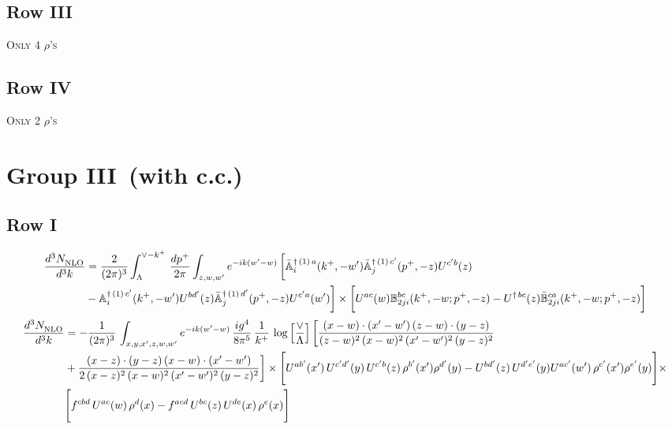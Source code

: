 \documentclass[9pt]{article}
\def\mf#1{\mathbb{#1}}
\numberwithin{equation}{section}
\begin{document}
\subsection{Row III}
\textsc{Only 4 $\rho$'s}
\subsection{Row IV}
\textsc{Only 2 $\rho$'s}
\section{Group III\, (with c.c.)}
\subsection{{\color{green}Row I}}
\begin{align}
 \frac{d^{3}N_{\rm NLO}^{\rm}}{d^{3}k}  & =    \frac{2}{(2\pi)^{3}} \int_{\Lambda}^{\vee - k^{+}}\, \frac{dp^{+}}{2\pi}\int_{z,w,w^{\prime}} e^{-ik(w^{\prime}-w)}\, 
        \bigg[\Bar{\mf{A}}^{\dagger\, (1)\, a}_{i}(k^{+},-w^{\prime})\Bar{\mf{A}}^{\dagger\, (1)\, c^{\prime}}_{j}(p^{+},-z)U^{c^{\prime}b}(z)\notag \\ & -\mf{A}^{\dagger\, (1)\, c^{\prime}}_{i}(k^{+},- w^{\prime})U^{bd^{\prime}}(z)\Bar{\mf{A}}^{\dagger\, (1)\, d^{\prime}}_{j}(p^{+},-z)U^{c^{\prime}a}(w^{\prime})  \bigg]\times \bigg[U^{ac}(w) \mf{B}^{bc}_{2ji}(k^{+},-w;p^{+},-z) -U^{\dagger\, bc}(z)\Bar{\mf{B}}^{ca}_{2ji}(k^{+},-w; p^{+},-z)\bigg] \nonumber
\end{align}
\begin{align}
    \frac{d^{3}N_{\rm NLO}^{\rm}}{d^{3}k}  & = -\frac{1}{(2\pi)^{3}}\, \int_{x,y,x',z,w,w^{\prime}} e^{-ik(w^{\prime}-w)}\,\frac{ig^{4}}{8\pi^{5}}\,\frac{1}{k^{+}}\,\log{\left[\frac{\vee}{\Lambda}\right]}\,\bigg[\frac{(x-w)\cdot (x'-w')\,(z-w)\cdot (y-z)}{(z-w)^{2}\,(x-w)^{2}\,(x'-w')^{2}\,(y-z)^{2}}\notag \\ & +\frac{(x-z)\cdot (y-z)\,(x-w)\cdot (x'-w')}{2\,(x-z)^{2}\, (x-w)^{2}\,(x'-w')^{2}\,(y-z)^{2}}\bigg]\times  \Bigg[U^{ab'}(x')\,U^{c'd'}(y)\,U^{c'b}(z)\,\rho^{b'}(x')\rho^{d'}(y)-U^{bd'}(z)\,U^{d'e'}(y)U^{ac'}(w')\,\rho^{c'}(x')\rho^{e'}(y)\Bigg]\times\notag \\ & \Bigg[f^{cbd}\,U^{ac}(w)\,\rho^{d}(x)-f^{acd}\, U^{bc}(z)\,U^{de}(x)\,\rho^{e}(x)\Bigg] 
\end{align}
\end{document}
